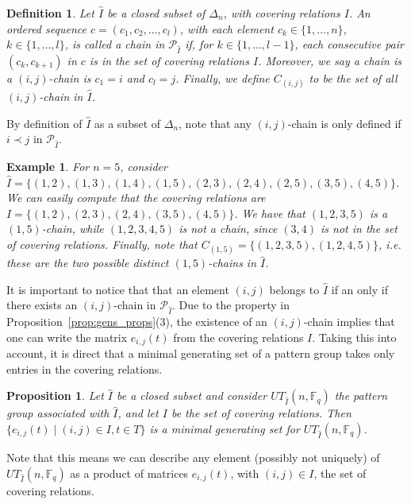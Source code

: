 \documentclass[11pt,letterpaper]{amsart}
\newtheorem{proposition}[theorem]{Proposition}
\newtheorem{definition}[theorem]{Definition}
\newtheorem{exmp}{Example}[section]
\newcommand{\PP}{\mathcal{P}}
\newcommand{\FF}{\mathbb{F}}
\begin{document}
\begin{definition}
    Let $\widehat{I}$ be a closed subset of $\Delta_n$, with covering relations $I$.
    An ordered sequence $c=(c_1,c_2,\ldots,c_l)$, with each element $c_k\in\{1,\ldots,n\}$, $k\in\{1,\ldots,l\}$, is called a \emph{chain} in $\PP_{\widehat{I}}$ if, for $k\in\{1,\ldots,l-1\}$, each consecutive pair $(c_k,c_{k+1})$ in $c$ is in the set of covering relations $I$.
    Moreover, we say a chain is a \emph{$(i,j)$-chain} is $c_1=i$ and $c_l=j$.
    Finally, we define $C_{(i,j)}$ to be the set of all $(i,j)$-chain in $\widehat{I}$.
\end{definition} 
By definition of $\widehat{I}$ as a subset of $\Delta_n$, note that any $(i,j)$-chain is only defined if $i \prec j$ in $\PP_{\widehat{I}}$.

\begin{exmp}
    For $n=5$, consider 
    $\widehat{I}=\{(1,2),(1,3),(1,4),(1,5),(2,3),(2,4),(2,5),(3,5),(4,5)\}$. We can easily compute that the covering relations are $I=\{(1,2),(2,3),(2,4),(3,5),(4,5)\}$.
    We have that $(1,2,3,5)$ is a $(1,5)$-chain, while $(1,2,3,4,5)$ is not a chain, since $(3,4)$ is not in the set of covering relations.
    Finally, note that $C_{(1,5)}=\{(1,2,3,5),(1,2,4,5)\}$, i.e. these are the two possible distinct $(1,5)$-chains in $\widehat{I}$.
\end{exmp}
It is important to notice that that an element $(i,j)$ belongs to $\widehat{I}$ if an only if there exists an $(i,j)$-chain in $\PP_{\widehat{I}}$. Due to the property in Proposition~\ref{prop:gens_props}(3), the existence of an $(i,j)$-chain implies that one can write the matrix $e_{i,j}(t)$ from the covering relations $I$.
Taking this into account, it is direct that a
minimal generating set of a pattern group takes only entries in the covering relations.

\begin{proposition}\cite[Example 2]{Diaconis2009}
\label{prop:Pattern_mingenset}
    Let $\widehat{I}$ be a closed subset and consider $UT_{\widehat{I}}(n,\FF_q)$ the pattern group associated with $\widehat{I}$, and let $I$ be the set of covering relations. 
    Then $\{e_{i,j}(t)\mid (i,j)\in I, t\in T\}$ is a minimal generating set for $UT_{\widehat{I}}(n,\FF_q)$. 
\end{proposition}
Note that this means we can describe any element (possibly not uniquely) of $UT_{\widehat{I}}(n,\FF_q)$ as a product of matrices $e_{i,j}(t)$, with $(i,j)\in I$, the set of covering relations.
\end{document}

